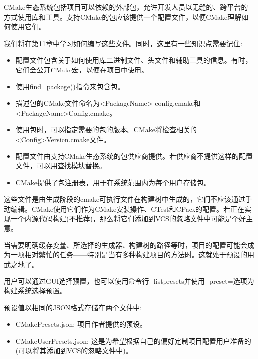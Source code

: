 CMake生态系统包括项目可以依赖的外部包，允许开发人员以无缝的、跨平台的方式使用库和工具。支持CMake的包应该提供一个配置文件，以便CMake理解如何使用它们。

我们将在第11章中学习如何编写这些文件。同时，这里有一些知识点需要记住:

\begin{itemize}
\item 
配置文件包含关于如何使用库二进制文件、头文件和辅助工具的信息。有时，它们会公开CMake宏，以便在项目中使用。

\item 
使用find\_package()指令来包含包。

\item 
描述包的CMake文件命名为<PackageName>-config.cmake和<PackageName>Config.cmake。

\item 
使用包时，可以指定需要的包的版本。CMake将检查相关的<Config>Version.cmake文件。

\item 
配置文件由支持CMake生态系统的包供应商提供。若供应商不提供这样的配置文件，可以用查找模块替换。

\item 
CMake提供了包注册表，用于在系统范围内为每个用户存储包。
\end{itemize}


这些文件是由生成阶段的cmake可执行文件在构建树中生成的，它们不应该通过手动编辑。CMake使用它们作为CMake安装操作、CTest和CPack的配置。若正在实现一个内源代码构建(不推荐)，那么将它们添加到VCS的忽略文件中可能是个好主意。


当需要明确缓存变量、所选择的生成器、构建树的路径等时，项目的配置可能会成为一项相对繁忙的任务——特别是当有多种构建项目的方法时。这就处于预设的用武之地了。

用户可以通过GUI选择预置，也可以使用命令行-{}-listpresets并使用-{}-preset=选项为构建系统选择预置。

预设值以相同的JSON格式存储在两个文件中:

\begin{itemize}
\item 
CMakePresets.json: 项目作者提供的预设。

\item 
CMakeUserPresets.json: 这是为希望根据自己的偏好定制项目配置用户准备的(可以将其添加到VCS的忽略文件中)。
\end{itemize}


